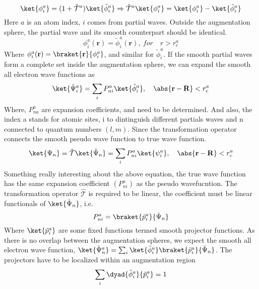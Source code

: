 \begin{equation}
\label{eq_aug_t}
\ket{\phi_i^a} = (1+\hat{\mathcal{T}}^a)\ket{\tilde{\phi}_i^a} \Rightarrow  \hat{\mathcal{T}}^a \ket{\phi_i^a} = \ket{\phi_i^a} - \ket{\tilde{\phi}_i^a}
\end{equation} 
Here $a$ is an atom index, $i$ comes from partial waves. Outside the augmentation sphere, the partial wave and its smooth counterpart should be identical.
\begin{equation}
\phi_i^a(\mathbf{r}) = \tilde{\phi}_i^a(\mathbf{r}),\  for \quad r > r_c^a
\end{equation} 
Where $\phi_i^a(\mathbf{r})=\braket{\mathbf{r}}{\phi_i^a}$, and similar for $\tilde{\phi}_i^a$. If the smooth partial waves form a complete set inside the augmentation sphere, we can expand the smooth all electron wave functions as 
\begin{equation}
\ket{\tilde{\Psi}_i^a} = \sum_i P_{ni}^a \ket{\tilde{\phi}_i^a}, \quad \abs{\mathbf{r}-\mathbf{R}} < r_c^a
\end{equation}
Where, $P_{na}^a$ are expansion coefficients, and need to be determined. And also, the index a stands for atomic sites, i to dintinguish different partials waves and n connected to quantum numbers $(l,m)$. Since the transformation operator connects the smooth pseudo wave function to true wave function.
\begin{equation}
\ket{\Psi_n} = \hat{\mathcal{T}} \ket{\tilde{\Psi}_n} = \sum_i P_{ni}^a \ket{\psi_i^a}, \quad \abs{\mathbf{r}-\mathbf{R}} < r_c^a
\end{equation} 
Something really interesting about the above equation, the true wave function has the same expansion coefficient $(P_{ni}^a)$ as the pseudo wavefucntion. The transformation operator $\hat{\mathcal{T}}$ is required to be linear, the coefficient must be linear functionals of $\ket{\tilde{\Psi}_n}$, i.e.
\begin{equation}
P_{ni}^a = \braket{\tilde{p}_i^a}{\tilde{\Psi}_n}
\end{equation}
Where $\ket{\tilde{p}_i^a}$ are some fixed functions termed smooth projector functions. As there is no overlap between the augmentation spheres, we expect the smooth all electron wave function, $\ket{\tilde{\Psi}_n^a} = \sum_i \ket{\tilde{\phi}_i^a} \braket{\tilde{p}_i^a}{\tilde{\Psi}_n}$. The projectors have to be localized within an augmentation region
\begin{equation}
\label{eq_paw_complete}
	\sum_i \dyad{\tilde{\phi}_i^a}{\tilde{p}_i^a} = 1
\end{equation}

